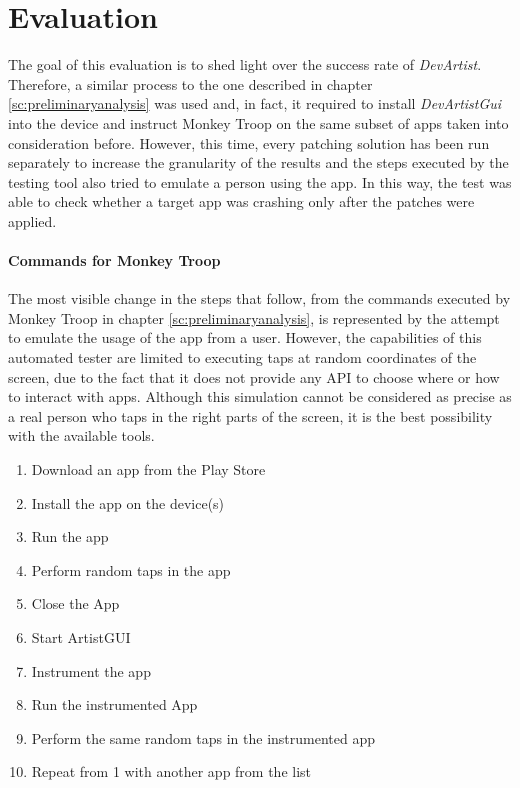 \chapter{Evaluation}
\label{ch:evaluation}
The goal of this evaluation is to shed light over the success rate of \emph{DevArtist}. Therefore, a similar process to the one described in chapter \ref{sc:preliminaryanalysis} was used and, in fact, it required to install \emph{DevArtistGui} into the device and instruct Monkey Troop on the same subset of apps taken into consideration before. However, this time, every patching solution has been run separately to increase the granularity of the results and the steps executed by the testing tool also tried to emulate a person using the app. In this way, the test was able to check whether a target app was crashing only after the patches were applied.

\subsubsection{Commands for Monkey Troop}
The most visible change in the steps that follow, from the commands executed by Monkey Troop in chapter \ref{sc:preliminaryanalysis}, is represented by the attempt to emulate the usage of the app from a user. However, the capabilities of this automated tester are limited to executing taps at random coordinates of the screen, due to the fact that it does not provide any API to choose where or how to interact with apps. Although this simulation cannot be considered as precise as a real person who taps in the right parts of the screen, it is the best possibility with the available tools.

\begin{enumerate}
	\item{Download an app from the Play Store}
	\item{Install the app on the device(s)}
	\item{Run the app}
	\item{Perform random taps in the app}
	\item{Close the App}
	\item{Start ArtistGUI}
	\item{Instrument the app}
	\item{Run the instrumented App}
	\item{Perform the same random taps in the instrumented app}
	\item{Repeat from 1 with another app from the list}
\end{enumerate}

